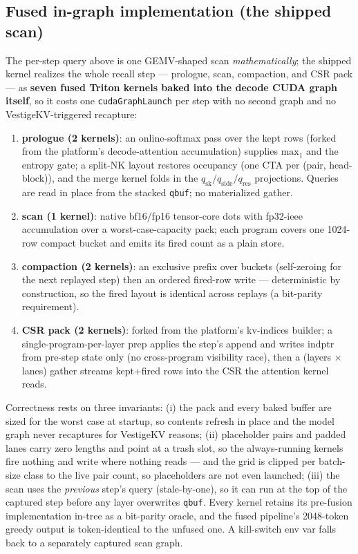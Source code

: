 \documentclass[11pt]{article}
\begin{document}
\subsection{Fused in-graph implementation (the shipped scan)}
The per-step query above is one GEMV-shaped scan \emph{mathematically};
the shipped kernel realizes the whole recall step --- prologue, scan,
compaction, and CSR pack --- as \textbf{seven fused Triton kernels baked
into the decode CUDA graph itself}, so it costs one \texttt{cudaGraphLaunch}
per step with no second graph and no VestigeKV-triggered recapture:
\begin{enumerate}[itemsep=1pt]
\item \textbf{prologue (2 kernels)}: an online-softmax pass over the kept
rows (forked from the platform's decode-attention accumulation) supplies
$\mathrm{max}_1$ and the entropy gate; a split-NK layout restores occupancy
(one CTA per (pair, head-block)), and the merge kernel folds in the
$q_{\mathrm{sk}}/q_{\mathrm{side}}/q_{\mathrm{res}}$ projections. Queries
are read in place from the stacked \texttt{qbuf}; no materialized gather.
\item \textbf{scan (1 kernel)}: native bf16/fp16 tensor-core dots with
fp32-ieee accumulation over a worst-case-capacity pack; each program covers
one 1024-row compact bucket and emits its fired count as a plain store.
\item \textbf{compaction (2 kernels)}: an exclusive prefix over buckets
(self-zeroing for the next replayed step) then an ordered fired-row write
--- deterministic by construction, so the fired layout is identical across
replays (a bit-parity requirement).
\item \textbf{CSR pack (2 kernels)}: forked from the platform's
kv-indices builder; a single-program-per-layer prep applies the step's
append and writes indptr from pre-step state only (no cross-program
visibility race), then a (layers $\times$ lanes) gather streams kept+fired
rows into the CSR the attention kernel reads.
\end{enumerate}
Correctness rests on three invariants: (i) the pack and every baked buffer
are sized for the worst case at startup, so contents refresh in place and
the model graph never recaptures for VestigeKV reasons; (ii) placeholder
pairs and padded lanes carry zero lengths and point at a trash slot, so the
always-running kernels fire nothing and write where nothing reads --- and
the grid is clipped per batch-size class to the live pair count, so
placeholders are not even launched; (iii) the scan uses the
\emph{previous} step's query (stale-by-one), so it can run at the top of
the captured step before any layer overwrites \texttt{qbuf}. Every kernel
retains its pre-fusion implementation in-tree as a bit-parity oracle, and
the fused pipeline's 2048-token greedy output is token-identical to the
unfused one. A kill-switch env var falls back to a separately captured
scan graph.
\end{document}
